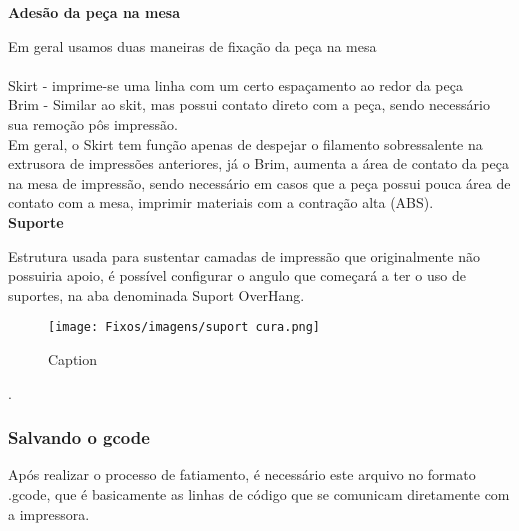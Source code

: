 \textbf{Adesão da peça na mesa}

Em geral usamos duas maneiras de fixação da peça na mesa \\[0.2cm] \\[0.2cm]

Skirt -  imprime-se uma linha com um certo espaçamento ao redor da peça \\[0.2cm]



Brim - Similar ao skit, mas possui contato direto com a peça, sendo necessário sua remoção pôs impressão.  \\[0.2cm]



Em geral, o Skirt tem função apenas de despejar o filamento sobressalente na extrusora de impressões anteriores, já o Brim, aumenta a área de contato da peça na mesa de impressão, sendo necessário em casos que a peça possui pouca área de contato com a mesa, imprimir materiais com a contração alta (ABS).\\[0.2cm]



\textbf{Suporte}



Estrutura usada para sustentar camadas de impressão que originalmente não possuiria apoio, é possível configurar o angulo que começará a ter o uso de suportes, na aba denominada Suport OverHang. \\[0.2cm]



\begin{figure}[h!]

    \centering

    \texttt{[image: Fixos/imagens/suport cura.png]}

    \caption{Caption}

    \label{fig:my_label}

\end{figure}

.

\subsubsection{Salvando o gcode}

Após realizar o processo de fatiamento, é necessário este arquivo no formato .gcode, que é basicamente as linhas de código que se comunicam diretamente com a impressora.\\[0.2cm]



